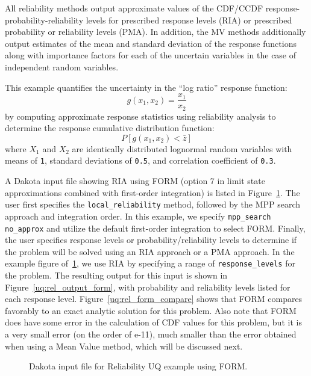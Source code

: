 All reliability methods output approximate values of the CDF/CCDF
response-probability-reliability levels for prescribed response levels
(RIA) or prescribed probability or reliability levels (PMA). In
addition, the MV methods additionally output estimates of the mean and
standard deviation of the response functions along with importance
factors for each of the uncertain variables in the case of independent
random variables.

This example quantifies the uncertainty in the ``log ratio'' response
function:
\begin{equation}
g(x_1,x_2) = \frac{x_1}{x_2}
\end{equation}
by computing approximate response statistics using reliability
analysis to determine the response cumulative distribution function:
\begin{equation}
P[g(x_1,x_2) < \bar{z}]
\end{equation}
where $X_1$ and $X_2$ are identically distributed lognormal random
variables with means of \texttt{1}, standard deviations of
\texttt{0.5}, and correlation coefficient of \texttt{0.3}.

A Dakota input file showing RIA using FORM (option 7 in limit state
approximations combined with first-order integration) is listed in
Figure~\ref{uq:rel_input_form}.
The user first specifies the \texttt{local\_reliability}
method, followed by the MPP search approach and integration order. In
this example, we specify \texttt{mpp\_search no\_approx} and utilize
the default first-order integration to select FORM. Finally, the user
specifies response levels or probability/reliability levels to
determine if the problem will be solved using an RIA approach or a PMA
approach. In the example figure of~\ref{uq:rel_input_form}, we use
RIA by specifying a range of \texttt{response\_levels} for the
problem. The resulting output for this input is shown in
Figure~\ref{uq:rel_output_form}, with probability and reliability
levels listed for each response level. Figure~\ref{uq:rel_form_compare} 
shows that FORM compares favorably to an exact analytic solution for
this problem. Also note that FORM does have some error in the
calculation of CDF values for this problem, but it is a very small
error (on the order of e-11), much smaller than the error obtained
when using a Mean Value method, which will be discussed next.
\begin{figure}
  \centering
  \begin{bigbox}
    \begin{small}
    \end{small}
  \end{bigbox}
\caption{Dakota input file for Reliability UQ example using FORM.}
\label{uq:rel_input_form}
\end{figure}

